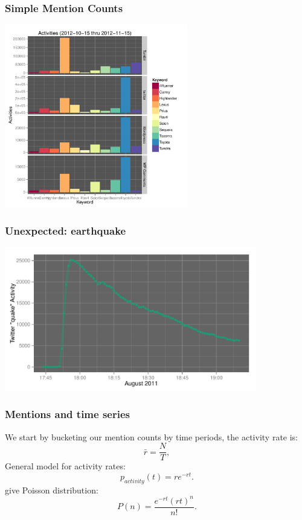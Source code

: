 \documentclass{beamer}
\begin{document}
\begin{frame}\frametitle{Simple Mention Counts}
  \begin{center}
    \includegraphics[width=8cm]{./imgs/TOY_bars.pdf} \\
  \end{center}
\end{frame}

\begin{frame}\frametitle{Unexpected: earthquake}
  \begin{center}
    \includegraphics[width=11cm]{./imgs/SMP_va_quake.pdf}
  \end{center}
\end{frame}


\begin{frame}
\frametitle{Mentions and time series} 
We start by bucketing our mention counts by time periods, the activity rate is:
\begin{equation*}
    \label{eq:rateEst}
    \bar{r} = \frac{N}{T},
\end{equation*}
General model for activity rates:
\begin{equation*}
    \label{eq:tbe}
    p_{activity}(t) = r e^{-r t}.
\end{equation*}
give Poisson distribution:
\begin{equation*}
    \label{eq:poisson}
    P(n) = \frac{e^{-r t} (r t)^n}{n!}.
\end{equation*}
\end{frame}
\end{document}

